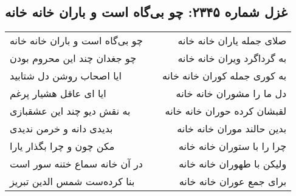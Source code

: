 \begin{center}
\section*{غزل شماره ۲۳۴۵: چو بی‌گاه است و باران خانه خانه}
\label{sec:2345}
\begin{longtable}{l p{0.5cm} r}
چو بی‌گاه است و باران خانه خانه
&&
صلای جمله یاران خانه خانه
\\
چو جغدان چند این محروم بودن
&&
به گرداگرد ویران خانه خانه
\\
ایا اصحاب روشن دل شتابید
&&
به کوری جمله کوران خانه خانه
\\
ایا ای عاقل هشیار پرغم
&&
دل ما را مشوران خانه خانه
\\
به نقش دیو چند این عشقبازی
&&
لقبشان کرده حوران خانه خانه
\\
بدیدی دانه و خرمن ندیدی
&&
بدین حالند موران خانه خانه
\\
مکن چون و چرا بگذار یارا
&&
چرا را با ستوران خانه خانه
\\
در آن خانه سماع ختنه سور است
&&
ولیکن با طهوران خانه خانه
\\
بنا کرده‌ست شمس الدین تبریز
&&
برای جمع عوران خانه خانه
\\
\end{longtable}
\end{center}
